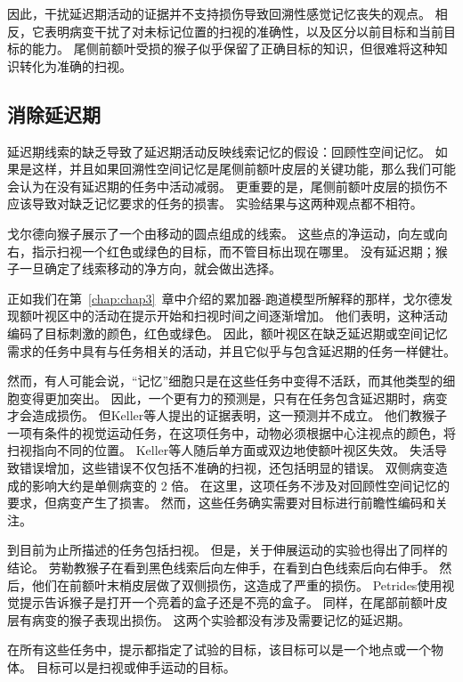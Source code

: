 因此，干扰延迟期活动的证据并不支持损伤导致回溯性感觉记忆丧失的观点。
相反，它表明病变干扰了对未标记位置的扫视的准确性，以及区分以前目标和当前目标的能力。
尾侧前额叶受损的猴子似乎保留了正确目标的知识，但很难将这种知识转化为准确的扫视。



\subsection{消除延迟期}

延迟期线索的缺乏导致了延迟期活动反映线索记忆的假设：回顾性空间记忆。
如果是这样，并且如果回溯性空间记忆是尾侧前额叶皮层的关键功能，那么我们可能会认为在没有延迟期的任务中活动减弱。
更重要的是，尾侧前额叶皮层的损伤不应该导致对缺乏记忆要求的任务的损害。
实验结果与这两种观点都不相符。


戈尔德\cite{gold2007neural}向猴子展示了一个由移动的圆点组成的线索。
这些点的净运动，向左或向右，指示扫视一个红色或绿色的目标，而不管目标出现在哪里。
没有延迟期；猴子一旦确定了线索移动的净方向，就会做出选择。


正如我们在第~\ref{chap:chap3}~章中介绍的累加器-跑道模型所解释的那样，戈尔德发现额叶视区中的活动在提示开始和扫视时间之间逐渐增加。
他们表明，这种活动编码了目标刺激的颜色，红色或绿色。
因此，额叶视区在缺乏延迟期或空间记忆需求的任务中具有与任务相关的活动，并且它似乎与包含延迟期的任务一样健壮。


然而，有人可能会说，“记忆”细胞只是在这些任务中变得不活跃，而其他类型的细胞变得更加突出。
因此，一个更有力的预测是，只有在任务包含延迟期时，病变才会造成损伤。
但Keller等人\cite{keller2008effect}提出的证据表明，这一预测并不成立。
他们教猴子一项有条件的视觉运动任务，在这项任务中，动物必须根据中心注视点的颜色，将扫视指向不同的位置。
Keller等人随后单方面或双边地使额叶视区失效。
失活导致错误增加，这些错误不仅包括不准确的扫视，还包括明显的错误。
双侧病变造成的影响大约是单侧病变的 2 倍。
在这里，这项任务不涉及对回顾性空间记忆的要求，但病变产生了损害。
然而，这些任务确实需要对目标进行前瞻性编码和关注。


到目前为止所描述的任务包括扫视。
但是，关于伸展运动的实验也得出了同样的结论。
劳勒\cite{lawler1987role}教猴子在看到黑色线索后向左伸手，在看到白色线索后向右伸手。
然后，他们在前额叶末梢皮层做了双侧损伤，这造成了严重的损伤。
Petrides\cite{petrides1985deficits}使用视觉提示告诉猴子是打开一个亮着的盒子还是不亮的盒子。
同样，在尾部前额叶皮层有病变的猴子表现出损伤。
这两个实验都没有涉及需要记忆的延迟期。


在所有这些任务中，提示都指定了试验的目标，该目标可以是一个地点\cite{keller2008effect}或一个物体\cite{petrides1985deficits}。
目标可以是扫视\cite{keller2008effect}或伸手运动\cite{lawler1987role}的目标。


